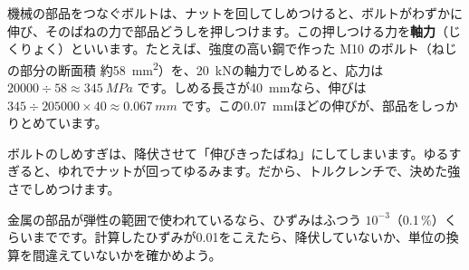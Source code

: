 \begin{phkougaku}
機械の部品をつなぐボルトは、ナットを回してしめつけると、ボルトがわずかに伸び、そのばねの力で部品どうしを押しつけます。この押しつける力を\textbf{軸力}（じくりょく）といいます。たとえば、強度の高い鋼で作った M10 のボルト（ねじの部分の断面積 約\qty{58}{mm^2}）を、\qty{20}{kN}の軸力でしめると、応力は $\num{20000}\div58\approx\qty{345}{MPa}$ です。しめる長さが\qty{40}{mm}なら、伸びは $345\div\num{205000}\times40\approx\qty{0.067}{mm}$ です。この\qty{0.07}{mm}ほどの伸びが、部品をしっかりとめています。

ボルトのしめすぎは、降伏させて「伸びきったばね」にしてしまいます。ゆるすぎると、ゆれでナットが回ってゆるみます。だから、トルクレンチで、決めた強さでしめつけます。
\begin{phketa}
金属の部品が弾性の範囲で使われているなら、ひずみはふつう $10^{-3}$（0.1\,\%）くらいまでです。計算したひずみが0.01をこえたら、降伏していないか、単位の換算を間違えていないかを確かめよう。
\end{phketa}
\end{phkougaku}

